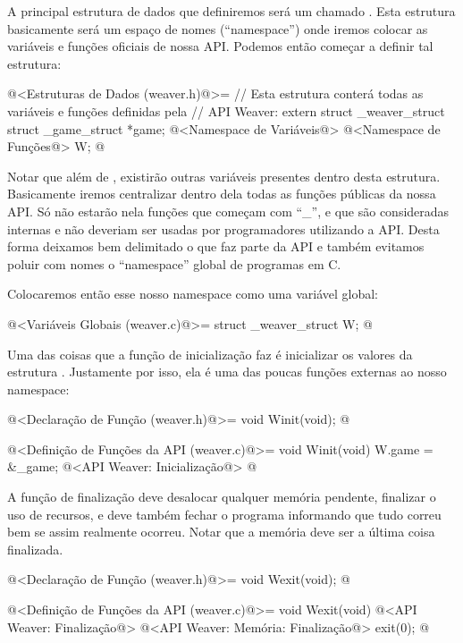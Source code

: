 
A principal estrutura de dados que definiremos será
um  chamado . Esta estrutura
basicamente será um espaço de nomes (``namespace'') onde iremos
colocar as variáveis e funções oficiais de nossa API. Podemos então
começar a definir tal estrutura:

\iniciocodigo
@<Estruturas de Dados (weaver.h)@>=
// Esta estrutura conterá todas as variáveis e funções definidas pela
// API Weaver:
extern struct _weaver_struct{
  struct _game_struct *game;
  @<Namespace de Variáveis@>
  @<Namespace de Funções@>
} W;
@
\fimcodigo

Notar que além de , existirão outras variáveis
presentes dentro desta estrutura. Basicamente iremos centralizar
dentro dela todas as funções públicas da nossa API. Só não estarão
nela funções que começam com ``\_'', e que são consideradas internas e
não deveriam ser usadas por programadores utilizando a API. Desta
forma deixamos bem delimitado o que faz parte da API e também evitamos
poluir com nomes o ``namespace'' global de programas em C.

Colocaremos então esse nosso namespace como uma variável global:

\iniciocodigo
@<Variáveis Globais (weaver.c)@>=
struct _weaver_struct W;
@
\fimcodigo


Uma das coisas que a função de inicialização faz é inicializar os
valores da estrutura . Justamente por isso, ela é uma
das poucas funções externas ao nosso namespace:

\iniciocodigo
@<Declaração de Função (weaver.h)@>=
void Winit(void);
@
\fimcodigo

\iniciocodigo
@<Definição de Funções da API (weaver.c)@>=
void Winit(void){
  W.game = &_game;
  @<API Weaver: Inicialização@>
}
@
\fimcodigo

A função de finalização deve desalocar qualquer memória pendente,
finalizar o uso de recursos, e deve também fechar o programa
informando que tudo correu bem se assim realmente ocorreu. Notar que a
memória deve ser a última coisa finalizada.

\iniciocodigo
@<Declaração de Função (weaver.h)@>=
void Wexit(void);
@
\fimcodigo

\iniciocodigo
@<Definição de Funções da API (weaver.c)@>=
void Wexit(void){
  @<API Weaver: Finalização@>
  @<API Weaver: Memória: Finalização@>
  exit(0);
}
@
\fimcodigo


